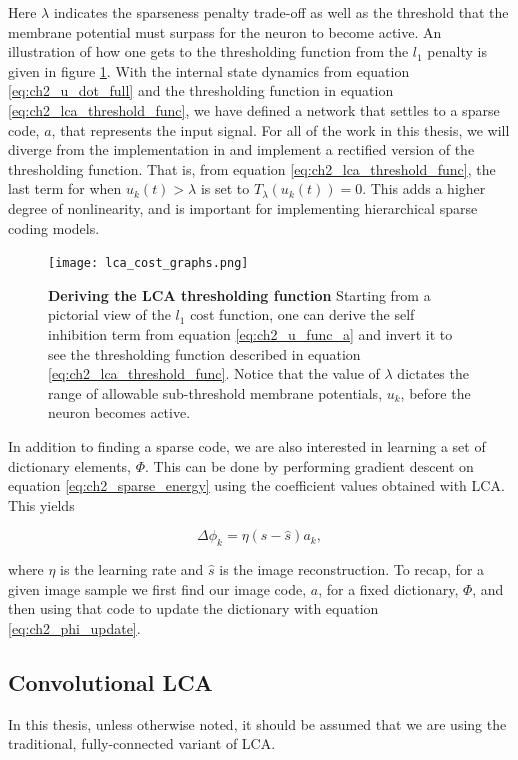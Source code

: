 Here $\lambda$ indicates the sparseness penalty trade-off as well as the threshold that the membrane potential must surpass for the neuron to become active. An illustration of how one gets to the thresholding function from the $l_{1}$ penalty is given in figure \ref{fig:ch2_lca_thresh}. With the internal state dynamics from equation \eqref{eq:ch2_u_dot_full} and the thresholding function in equation \eqref{eq:ch2_lca_threshold_func}, we have defined a network that settles to a sparse code, $a$, that represents the input signal. For all of the work in this thesis, we will diverge from the implementation in \parencite{rozell2008sparse} and implement a rectified version of the thresholding function. That is, from equation \ref{eq:ch2_lca_threshold_func}, the last term for when $u_{k}(t) > \lambda$ is set to $T_{\lambda}(u_{k}(t))=0$. This adds a higher degree of nonlinearity, and is important for implementing hierarchical sparse coding models.

\begin{figure}[ht]\label{fig:ch2_lca_thresh}
\centering %
\texttt{[image: lca\_cost\_graphs.png]}
\caption{\textbf{Deriving the LCA thresholding function} Starting from a pictorial view of the $l_{1}$ cost function, one can derive the self inhibition term from equation \eqref{eq:ch2_u_func_a} and invert it to see the thresholding function described in equation \eqref{eq:ch2_lca_threshold_func}. Notice that the value of $\lambda$ dictates the range of allowable sub-threshold membrane potentials, $u_{k}$, before the neuron becomes active.}
\end{figure}

In addition to finding a sparse code, we are also interested in learning a set of dictionary elements, $\Phi$. This can be done by performing gradient descent on equation \eqref{eq:ch2_sparse_energy} using the coefficient values obtained with LCA. This yields

\begin{equation}\label{eq:ch2_phi_update}
    \Delta \phi_{k} = \eta (s - \hat{s}) a_{k},
\end{equation}

\noindent where $\eta$ is the learning rate and $\hat{s}$ is the image reconstruction. To recap, for a given image sample we first find our image code, $a$, for a fixed dictionary, $\Phi$, and then using that code to update the dictionary with equation \eqref{eq:ch2_phi_update}.


\subsection{Convolutional LCA}
In this thesis, unless otherwise noted, it should be assumed that we are using the traditional, fully-connected variant of LCA.

